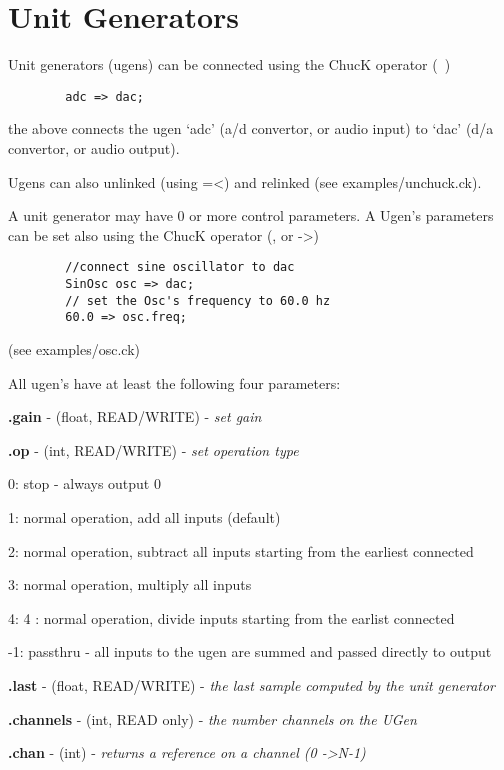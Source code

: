 \chapter{Unit Generators}

Unit generators (ugens) can be connected using the ChucK operator (~\chuckop)

\example
\begin{verbatim}
        adc => dac;
\end{verbatim}

the above connects the ugen `adc' (a/d convertor, or audio input) to `dac'  
(d/a convertor, or audio output).

Ugens can also unlinked (using =\textless) and relinked (see examples/unchuck.ck). 

A unit generator may have 0 or more control parameters.  
A Ugen's parameters can be set also using the ChucK operator (\chuckop, or -\textgreater) 

\example

\begin{verbatim}
        //connect sine oscillator to dac
        SinOsc osc => dac;
        // set the Osc's frequency to 60.0 hz
        60.0 => osc.freq;
\end{verbatim}
  (see examples/osc.ck)

\newpage

All ugen's have at least the following four parameters:

\control
\begin{chuckitemize}
\item {\bf .gain} - (float, READ/WRITE) - {\it set gain} 
\item {\bf .op} - (int, READ/WRITE) - {\it set operation type }
  \begin{chuckitemize}
    \item 0: stop - always output 0 
    \item 1: normal operation, add all inputs (default)
    \item 2: normal operation, subtract all inputs starting from the earliest connected
    \item 3: normal operation, multiply all inputs
    \item 4: 4 : normal operation, divide inputs starting from the earlist connected
    \item -1: passthru - all inputs to the ugen are summed and passed directly to output
  \end{chuckitemize}
\item {\bf .last} - (float, READ/WRITE) - {\it the last sample computed by the unit generator}
\item {\bf .channels} - (int, READ only) - {\it the number channels on the UGen}
\item {\bf .chan} - (int) - {\it returns a reference on a channel (0 -\textgreater N-1)}
\end{chuckitemize}

